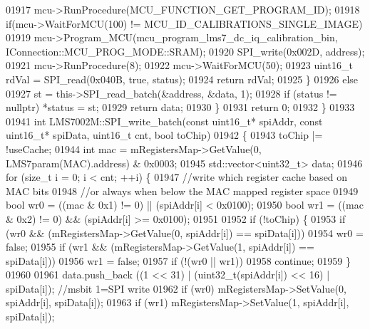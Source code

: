 \begin{DoxyCode}
{{{{{{{{{{{{{{{{{{{{{{{{{{{{{{{{{{{{{{{{{{{{{{{{{{{{{{{01917             mcu->RunProcedure(MCU_FUNCTION_GET_PROGRAM_ID);
01918             \textcolor{keywordflow}{if}(mcu->WaitForMCU(100) != MCU_ID_CALIBRATIONS_SINGLE_IMAGE)
01919                 mcu->Program_MCU(mcu_program_lms7_dc_iq_calibration_bin, IConnection::MCU\_PROG\_MODE::SRAM);
01920             SPI_write(0x002D, address);
01921             mcu->RunProcedure(8);
01922             mcu->WaitForMCU(50);
01923             uint16\_t rdVal = SPI_read(0x040B, \textcolor{keyword}{true}, status);
01924             \textcolor{keywordflow}{return} rdVal;
01925         \}
01926         \textcolor{keywordflow}{else}
01927             st = this->SPI_read_batch(&address, &data, 1);
01928         \textcolor{keywordflow}{if} (status != \textcolor{keyword}{nullptr}) *status = st;
01929         \textcolor{keywordflow}{return} data;
01930     \}
01931     \textcolor{keywordflow}{return} 0;
01932 \}
01933 
01941 \textcolor{keywordtype}{int} LMS7002M::SPI_write_batch(\textcolor{keyword}{const} uint16\_t* spiAddr, \textcolor{keyword}{const} uint16\_t* spiData, uint16\_t cnt, \textcolor{keywordtype}{bool} 
      toChip)
01942 \{
01943     toChip |= !useCache;
01944     \textcolor{keywordtype}{int} mac = mRegistersMap->GetValue(0, LMS7param(MAC).address) & 0x0003;
01945     std::vector<uint32\_t> data;
01946     \textcolor{keywordflow}{for} (\textcolor{keywordtype}{size\_t} i = 0; i < cnt; ++i) \{
01947         \textcolor{comment}{//write which register cache based on MAC bits}
01948         \textcolor{comment}{//or always when below the MAC mapped register space}
01949         \textcolor{keywordtype}{bool} wr0 = ((mac & 0x1) != 0) || (spiAddr[i] < 0x0100);
01950         \textcolor{keywordtype}{bool} wr1 = ((mac & 0x2) != 0) && (spiAddr[i] >= 0x0100);
01951 
01952         \textcolor{keywordflow}{if} (!toChip) \{
01953             \textcolor{keywordflow}{if} (wr0 && (mRegistersMap->GetValue(0, spiAddr[i]) == spiData[i]))
01954                 wr0 = \textcolor{keyword}{false};
01955             \textcolor{keywordflow}{if} (wr1 && (mRegistersMap->GetValue(1, spiAddr[i]) == spiData[i]))
01956                 wr1 = \textcolor{keyword}{false};
01957             \textcolor{keywordflow}{if} (!(wr0 || wr1))
01958                 \textcolor{keywordflow}{continue};
01959         \}
01960 
01961         data.push\_back ((1 << 31) | (uint32\_t(spiAddr[i]) << 16) | spiData[i]); \textcolor{comment}{//msbit 1=SPI write}
01962         \textcolor{keywordflow}{if} (wr0) mRegistersMap->SetValue(0, spiAddr[i], spiData[i]);
01963         \textcolor{keywordflow}{if} (wr1) mRegistersMap->SetValue(1, spiAddr[i], spiData[i]);
}}}}}}}}}}}}}}}}}}}}}}}}}}}}}}}}}}}}}}}}}}}}}}}}}}}}}}}
\end{DoxyCode}
